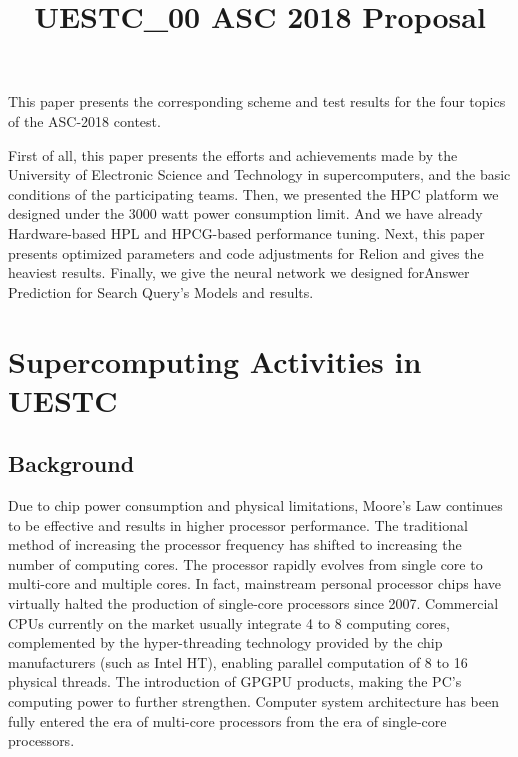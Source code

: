 \documentclass{mcmthesis}
\title{UESTC\_00 ASC 2018 Proposal}
\begin{document}
\begin{summarysheet}
\par This paper presents the corresponding scheme and test results for the four topics of the ASC-2018 contest.
\par First of all, this paper presents the efforts and achievements made by the University of Electronic Science and Technology in supercomputers, and the basic conditions of the participating teams. Then, we presented the HPC platform we designed under the 3000 watt power consumption limit. And we have already Hardware-based HPL and HPCG-based performance tuning. Next, this paper presents optimized parameters and code adjustments for Relion and gives the heaviest results. Finally, we give the neural network we designed forAnswer Prediction for Search Query's Models and results.


\end{summarysheet}

\maketitle


\tableofcontents
\newpage

\section{Supercomputing Activities in UESTC}

\subsection{Background}

\par Due to chip power consumption and physical limitations, Moore's Law continues to be effective and results in higher processor performance. The traditional method of increasing the processor frequency has shifted to increasing the number of computing cores. The processor rapidly evolves from single core to multi-core and multiple cores. In fact, mainstream personal processor chips have virtually halted the production of single-core processors since 2007. Commercial CPUs currently on the market usually integrate 4 to 8 computing cores, complemented by the hyper-threading technology provided by the chip manufacturers (such as Intel HT), enabling parallel computation of 8 to 16 physical threads. The introduction of GPGPU products, making the PC's computing power to further strengthen. Computer system architecture has been fully entered the era of multi-core processors from the era of single-core processors.
\end{document}
